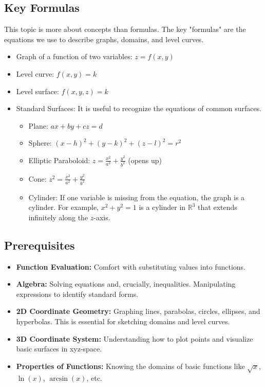 \documentclass{article}
\begin{document}
\subsection{Key Formulas}
This topic is more about concepts than formulas. The key "formulas" are the equations we use to describe graphs, domains, and level curves.
\begin{itemize}
    \item Graph of a function of two variables: $z = f(x, y)$
    \item Level curve: $f(x, y) = k$
    \item Level surface: $f(x, y, z) = k$
    \item Standard Surfaces: It is useful to recognize the equations of common surfaces.
    \begin{itemize}
        \item Plane: $ax + by + cz = d$
        \item Sphere: $(x-h)^2 + (y-k)^2 + (z-l)^2 = r^2$
        \item Elliptic Paraboloid: $z = \frac{x^2}{a^2} + \frac{y^2}{b^2}$ (opens up)
        \item Cone: $z^2 = \frac{x^2}{a^2} + \frac{y^2}{b^2}$
        \item Cylinder: If one variable is missing from the equation, the graph is a cylinder. For example, $x^2 + y^2 = 1$ is a cylinder in $\mathbb{R}^3$ that extends infinitely along the $z$-axis.
    \end{itemize}
\end{itemize}

\subsection{Prerequisites}
\begin{itemize}
    \item \textbf{Function Evaluation:} Comfort with substituting values into functions.
    \item \textbf{Algebra:} Solving equations and, crucially, inequalities. Manipulating expressions to identify standard forms.
    \item \textbf{2D Coordinate Geometry:} Graphing lines, parabolas, circles, ellipses, and hyperbolas. This is essential for sketching domains and level curves.
    \item \textbf{3D Coordinate System:} Understanding how to plot points and visualize basic surfaces in xyz-space.
    \item \textbf{Properties of Functions:} Knowing the domains of basic functions like $\sqrt{x}$, $\ln(x)$, $\arcsin(x)$, etc.
\end{itemize}
\end{document}
